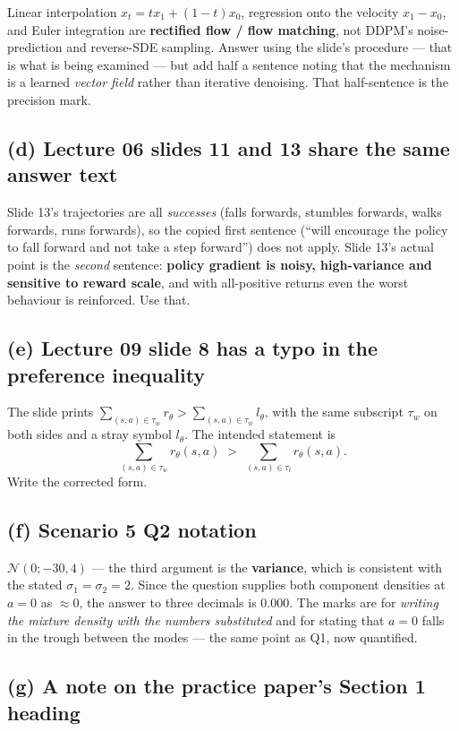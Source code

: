\documentclass[11pt,a4paper]{article}
\begin{document}
Linear interpolation $x_t=tx_1+(1-t)x_0$, regression onto the velocity
$x_1-x_0$, and Euler integration are \textbf{rectified flow / flow matching},
not DDPM's noise-prediction and reverse-SDE sampling. Answer using the
slide's procedure --- that is what is being examined --- but add half a
sentence noting that the mechanism is a learned \emph{vector field} rather
than iterative denoising. That half-sentence is the precision mark.

\subsection{(d) Lecture 06 slides 11 and 13 share the same answer text}

Slide 13's trajectories are all \emph{successes} (falls forwards, stumbles
forwards, walks forwards, runs forwards), so the copied first sentence
(``will encourage the policy to fall forward and not take a step forward'')
does not apply. Slide 13's actual point is the \emph{second} sentence:
\textbf{policy gradient is noisy, high-variance and sensitive to reward
scale}, and with all-positive returns even the worst behaviour is reinforced.
Use that.

\subsection{(e) Lecture 09 slide 8 has a typo in the preference inequality}

The slide prints
$\sum_{(s,a)\in\tau_w} r_\theta > \sum_{(s,a)\in\tau_w} l_\theta$,
with the same subscript $\tau_w$ on both sides and a stray symbol $l_\theta$.
The intended statement is
\[
\sum_{(s,a)\in\tau_w} r_\theta(s,a) \;>\; \sum_{(s,a)\in\tau_l} r_\theta(s,a).
\]
Write the corrected form.

\subsection{(f) Scenario 5 Q2 notation}

$\mathcal N(0;-30,4)$ --- the third argument is the \textbf{variance}, which is
consistent with the stated $\sigma_1=\sigma_2=2$. Since the question supplies
both component densities at $a=0$ as $\approx 0$, the answer to three decimals
is $\mathbf{0.000}$. The marks are for \emph{writing the mixture density with
the numbers substituted} and for stating that $a=0$ falls in the trough
between the modes --- the same point as Q1, now quantified.

\subsection{(g) A note on the practice paper's Section 1 heading}
\end{document}
